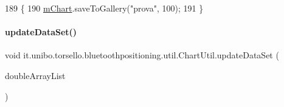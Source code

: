 \begin{DoxyCode}
189                                  \{
190         \hyperlink{classit_1_1unibo_1_1torsello_1_1bluetoothpositioning_1_1util_1_1ChartUtil_a60b5bd6796cc5dcde12d9a6bb3e67c86_a60b5bd6796cc5dcde12d9a6bb3e67c86}{mChart}.saveToGallery(\textcolor{stringliteral}{"prova"}, 100);
191     \}
\end{DoxyCode}
\hypertarget{classit_1_1unibo_1_1torsello_1_1bluetoothpositioning_1_1util_1_1ChartUtil_aa9bda04d2c2058fb1b3fcd72c5a7471d_aa9bda04d2c2058fb1b3fcd72c5a7471d}{}\label{classit_1_1unibo_1_1torsello_1_1bluetoothpositioning_1_1util_1_1ChartUtil_aa9bda04d2c2058fb1b3fcd72c5a7471d_aa9bda04d2c2058fb1b3fcd72c5a7471d} 
\paragraph{\texorpdfstring{update\+Data\+Set()}{updateDataSet()}}
{\footnotesize\ttfamily void it.\+unibo.\+torsello.\+bluetoothpositioning.\+util.\+Chart\+Util.\+update\+Data\+Set (\begin{DoxyParamCaption}\item[{final Array\+List$<$ Double $>$}]{double\+Array\+List }\end{DoxyParamCaption})}


